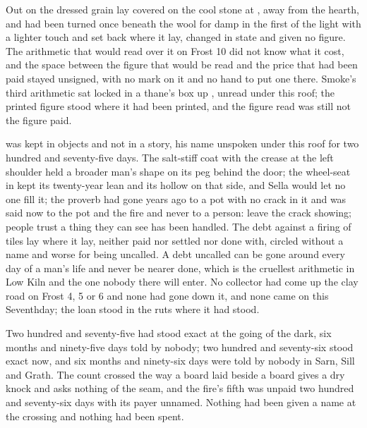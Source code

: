 Out on  the dressed grain lay covered on the cool stone at , away from the hearth, and had been turned once beneath the wool for damp in the first of the light with a lighter touch and set back where it lay, changed in state and given no figure. The arithmetic that would read over it on Frost 10 did not know what it cost, and the space between the figure that would be read and the price that had been paid stayed unsigned, with no mark on it and no hand to put one there. Smoke's third arithmetic sat locked in a thane's box up , unread under this roof; the printed figure stood where it had been printed, and the figure read was still not the figure paid.

 was kept in objects and not in a story, his name unspoken under this roof for two hundred and seventy-five days. The salt-stiff coat with the crease at the left shoulder held a broader man's shape on its peg behind the door; the wheel-seat in  kept its twenty-year lean and its hollow on that side, and Sella would let no one fill it; the proverb had gone years ago to a pot with no crack in it and was said now to the pot and the fire and never to a person: leave the crack showing; people trust a thing they can see has been handled. The debt against a firing of tiles lay where it lay, neither paid nor settled nor done with, circled without a name and worse for being uncalled. A debt uncalled can be gone around every day of a man's life and never be nearer done, which is the cruellest arithmetic in Low Kiln and the one nobody there will enter. No collector had come up the clay road on Frost 4, 5 or 6 and none had gone down it, and none came on this Seventhday; the loan stood in the ruts where it had stood.

Two hundred and seventy-five had stood exact at the going of the dark, six months and ninety-five days told by nobody; two hundred and seventy-six stood exact now, and six months and ninety-six days were told by nobody in Sarn, Sill and Grath. The count crossed the way a board laid beside a board gives a dry knock and asks nothing of the seam, and the fire's fifth was unpaid two hundred and seventy-six days with its payer unnamed. Nothing had been given a name at the crossing and nothing had been spent.

\scenebreak


